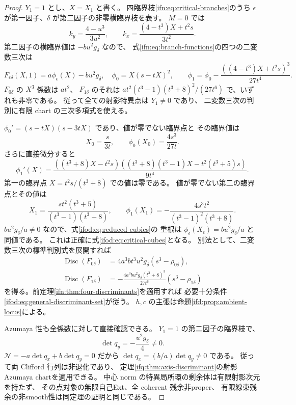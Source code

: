 \begin{proof}
$Y_1=1$ とし、$X=X_1$ と書く。
四臨界枝\eqref{ifn:eq:critical-branches}のうち
$\epsilon$ が第一因子、$\delta$ が第二因子の非零横臨界枝を表す。
$M=0$ では
\[
 k_y=\frac{4-u^3}{3u^2},\qquad
 k_x=\frac{(4-t^3)X+t^2s}{3t^2}.
\]
第二因子の横臨界値は $-bu^2g_\delta$ なので、
式\eqref{ifn:eq:branch-functions}の四つの二変数三次は
\begin{equation}\label{ifod:eq:reduced-cubics}
 F_{\epsilon\delta}(X,1)=a\phi_\epsilon(X)-bu^2g_\delta,
\quad
 \phi_0=X(s-tX)^2,\qquad
 \phi_1=\phi_0-\frac{((4-t^3)X+t^2s)^3}{27t^4}.
\end{equation}
$F_{0\delta}$ の $X^3$ 係数は $at^2$、
$F_{1\delta}$ のそれは
$at^2(t^3-1)(t^3+8)^2/(27t^6)$ で、いずれも非零である。
従って全ての射影特異点は $Y_1\ne0$ であり、
二変数三次の判別に有限 chart の三次多項式を使える。

$\phi_0'=(s-tX)(s-3tX)$ であり、値が零でない臨界点と
その臨界値は
\[
 X_0=\frac{s}{3t},\qquad
 \phi_0(X_0)=\frac{4s^3}{27t}.
\]
さらに直接微分すると
\begin{equation}\label{ifod:eq:phi-one-derivative}
 \phi_1'(X)=
 \frac{((t^3+8)X-t^2s)
   ((t^3+8)(t^3-1)X-t^2(t^3+5)s)}{9t^4}.
\end{equation}
第一の臨界点 $X=t^2s/(t^3+8)$ での値は零である。
値が零でない第二の臨界点とその値は
\begin{equation}\label{ifod:eq:second-value}
 X_1=\frac{st^2(t^3+5)}{(t^3-1)(t^3+8)},\qquad
 \phi_1(X_1)=-\frac{4s^3t^2}{(t^3-1)^2(t^3+8)}.
\end{equation}
$b u^2g_\delta/a\ne0$ なので、式\eqref{ifod:eq:reduced-cubics}の
重根は $\phi_\epsilon(X_\epsilon)=bu^2g_\delta/a$ と同値である。
これは正確に式\eqref{ifod:eq:critical-cubes}となる。
別法として、二変数三次の標準判別式を展開すれば
\begin{equation}\label{ifod:eq:factor-four-discriminants}
 \begin{aligned}
 \operatorname{Disc}(F_{0\delta})
   &=4a^3bt^3u^2g_\delta(s^3-\rho_{0\delta}),\\
 \operatorname{Disc}(F_{1\delta})
   &=-\frac{4a^3bu^2g_\delta(t^3+8)^3}{27t^6}
                       (s^3-\rho_{1\delta})
 \end{aligned}
\end{equation}
を得る。前定理\ref{ifn:thm:four-discriminants}を適用すれば
必要十分条件\eqref{ifod:eq:general-discriminant-set}が従う。
$h,c$ の主張は命題\ref{ifd:prop:ambient-locus}による。

Azumaya 性も全係数に対して直接確認できる。
$Y_1=1$ の第二因子の臨界枝で、
\begin{equation}\label{ifod:eq:nonzero-determinants}
              \det q_y=-\frac{u^2g_\delta}{4}\ne0.
\end{equation}
$\mathcal N=-a\det q_x+b\det q_y=0$ だから
$\det q_x=(b/a)\det q_y\ne0$ である。
従って両 Clifford 行列は非退化であり、
定理\ref{ifq:thm:axis-discriminant}の射影Azumaya chartを適用できる。
中心 norm の特異局所環の剰余体は有限射影次元を持たず、
その点対象の無限自己Ext、全 coherent 残余非proper、
有限線束残余の非smooth性は同定理の証明と同じである。
\end{proof}

